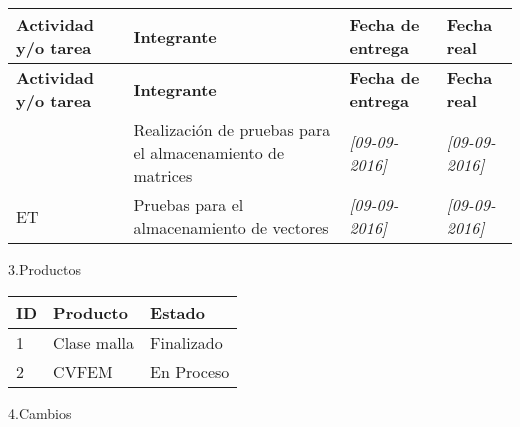 \documentclass[12pt]{report}
\numberwithin{equation}{section}
\begin{document}
\begin{flushleft}
\begin{longtable}[H]{|m{5cm}|m{3cm}|m{3cm}|m{3cm}|} 
\hline
\small{\textbf{Actividad y/o tarea }} &\small{ \textbf{Integrante}} & \small{\textbf{Fecha de entrega}} & \small{\textbf{Fecha real}}\\
\hline \hline
\endfirsthead

\hline
\small{\textbf{Actividad y/o tarea }} &\small{ \textbf{Integrante}} & \small{\textbf{Fecha de entrega}} & \small{\textbf{Fecha real}}\\
\hline \hline
\endhead
\hline
\endfoot

\endlastfoot
\hline
\hline
\small{} & \small{Realizaci\'on de pruebas para el almacenamiento de matrices} &\small{ \textit{[09-09-2016]}} & \small{\textit{[09-09-2016]}}\\
\hline
\small{ET} &\small{Pruebas para el almacenamiento de vectores} &\small{ \textit{[09-09-2016]}} & \small{\textit{[09-09-2016]}}\\
\hline
\hline
\end{longtable}

\newpage

\large{3.Productos }
\begin{table}[H]
\begin{tabular}{|m{0.5cm}|m{7.5cm}|m{6cm}|}
\hline 
\textbf{ID } & \textbf{Producto} & \textbf{Estado} \\
\hline
\hline
 1 & \small{Clase malla} & \small{Finalizado}\\
\hline
 2 & \small{CVFEM} & \small{En Proceso}\\
\hline
\end{tabular}
\label{tabla: TABLA CE Productos}
\end{table}



\large{4.Cambios}\\


\end{flushleft}
\end{document}
